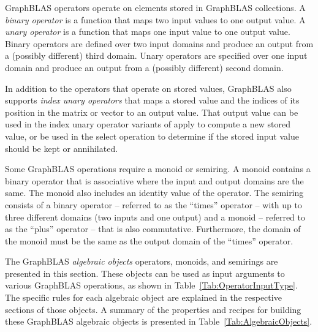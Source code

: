 GraphBLAS operators operate on elements stored in GraphBLAS collections. A 
\emph{binary operator} is a function that maps two input values to one 
output value. A \emph{unary operator} is a function that maps one input value 
to one output value.  Binary operators are defined over two input domains
and produce an output from a (possibly different) third domain. Unary
operators are specified over one input domain and produce an output from a
(possibly different) second domain.

In addition to the operators that operate on stored values, GraphBLAS
also supports \emph{index unary operators} that maps a stored value and 
the indices of its position in the matrix or vector to an output value.
That output value can be used in the index unary operator variants of apply 
to compute a new stored value, or be used in the select operation to 
determine if the stored input value should be kept or annihilated.

Some GraphBLAS operations require a monoid or semiring.  A monoid contains a 
binary operator that is associative where the input and output domains are
the same. The monoid also includes an identity value of the operator.
The semiring consists of a binary operator -- referred to as the ``times'' 
operator -- with up to three different domains (two inputs
and one output) and a monoid -- referred to as the ``plus'' operator -- that
is also commutative.  Furthermore, the domain
of the monoid must be the same as the output domain of the ``times'' operator.

The GraphBLAS \emph{algebraic objects} operators, monoids, and semirings
are presented in this section.
These objects can be used as input arguments to various GraphBLAS
operations, as shown in Table~\ref{Tab:OperatorInputType}.
The specific rules for each algebraic object
are explained in the respective sections of those objects.  A summary
of the properties and recipes for building these GraphBLAS algebraic
objects is presented in Table~\ref{Tab:AlgebraicObjects}.

